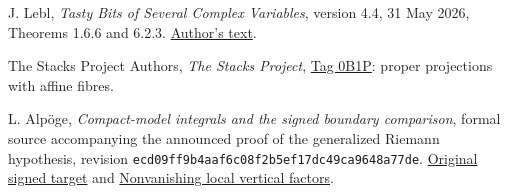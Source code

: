 J. Lebl, \emph{Tasty Bits of Several Complex Variables},
version 4.4, 31 May 2026, Theorems 1.6.6 and 6.2.3.
\href{https://www.jirka.org/scv/scv.pdf}{Author's text}.

The Stacks Project Authors, \emph{The Stacks Project},
\href{https://stacks.math.columbia.edu/tag/0B1P}{Tag 0B1P}:
proper projections with affine fibres.

L. Alp\"oge, \emph{Compact-model integrals and the signed boundary
comparison}, formal source accompanying the announced proof of the
generalized Riemann hypothesis, revision
\texttt{ecd09ff9b4aaf6c08f2b5ef17dc49ca9648a77de}.
\href{https://github.com/jsmorph/rh/blob/ecd09ff9b4aaf6c08f2b5ef17dc49ca9648a77de/lean/src/Development/AutomorphicSpectrum/ParallelStatements/ParallelGeometry/StokesLimitBound.lean}{Original signed target} and
\href{https://github.com/jsmorph/rh/blob/ecd09ff9b4aaf6c08f2b5ef17dc49ca9648a77de/lean/src/GroundTheory/HeightsAndTheta/Heights/ElementarySymmetric/PNbarLeviChartReg.lean}{Nonvanishing local vertical factors}.
